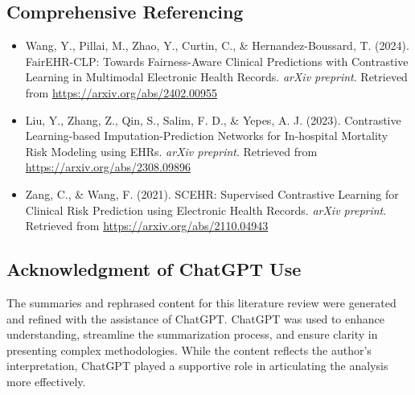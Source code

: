 \documentclass[a4paper]{article}
\begin{document}
    \subsection{Comprehensive Referencing}
    \begin{itemize}
        \item Wang, Y., Pillai, M., Zhao, Y., Curtin, C., \& Hernandez-Boussard,
            T. (2024). FairEHR-CLP: Towards Fairness-Aware Clinical Predictions with
            Contrastive Learning in Multimodal Electronic Health Records.
            \textit{arXiv preprint}. Retrieved from
            \url{https://arxiv.org/abs/2402.00955}

        \item Liu, Y., Zhang, Z., Qin, S., Salim, F. D., \& Yepes, A. J. (2023).
            Contrastive Learning-based Imputation-Prediction Networks for In-hospital
            Mortality Risk Modeling using EHRs. \textit{arXiv preprint}. Retrieved
            from \url{https://arxiv.org/abs/2308.09896}

        \item Zang, C., \& Wang, F. (2021). SCEHR: Supervised Contrastive
            Learning for Clinical Risk Prediction using Electronic Health
            Records. \textit{arXiv preprint}. Retrieved from \url{https://arxiv.org/abs/2110.04943}
    \end{itemize}

    \subsection{Acknowledgment of ChatGPT Use}
    The summaries and rephrased content for this literature review were
    generated and refined with the assistance of ChatGPT. ChatGPT was used to enhance
    understanding, streamline the summarization process, and ensure clarity in presenting
    complex methodologies. While the content reflects the author's
    interpretation, ChatGPT played a supportive role in articulating the analysis
    more effectively.
\end{document}
